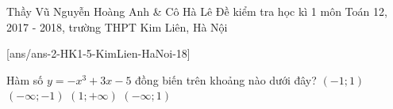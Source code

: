 \begin{name}
{Thầy Vũ Nguyễn Hoàng Anh \& Cô Hà Lê}
{Đề kiểm tra học kì 1 môn Toán 12, 2017 - 2018, trường THPT Kim Liên, Hà Nội}
\end{name}
\setcounter{ex}{0}
[ans/ans-2-HK1-5-KimLien-HaNoi-18]

\begin{ex}%
Hàm số $y=-x^3+3x-5$ đồng biến trên khoảng nào dưới đây?
\choice
{\True $(-1;1)$}
{$(-\infty;-1)$}
{$(1;+\infty)$}
{$(-\infty;1)$}
\end{ex}

